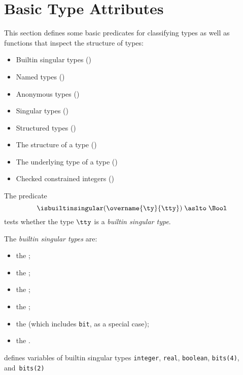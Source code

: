 \section{Basic Type Attributes\label{sec:BasicTypeAttributes}}

This section defines some basic predicates for classifying types as well as
functions that inspect the structure of types:
\begin{itemize}
  \item Builtin singular types ()
  \item Named types ()
  \item Anonymous types ()
  \item Singular types ()
  \item Structured types ()
  \item The structure of a type ()
  \item The underlying type of a type ()
  \item Checked constrained integers ()
\end{itemize}

\hypertarget{def-isbuiltinsingular}{}
The predicate
\[
  \isbuiltinsingular(\overname{\ty}{\tty}) \;\aslto\; \Bool
\]
tests whether the type $\tty$ is a \emph{builtin singular type}.

\ProseParagraph
The \emph{builtin singular types} are:
\begin{itemize}
\item the \integertypesterm{};
\item the \realtypeterm{};
\item the \stringtypeterm{};
\item the \booleantypeterm{};
\item the \bitvectortypeterm{} (which includes \texttt{bit}, as a special case);
\item the \enumerationtypeterm{}.
\end{itemize}

 defines variables of builtin singular types
\texttt{integer}, \texttt{real},
\texttt{boolean}, \texttt{bits(4)}, and~\texttt{bits(2)}


